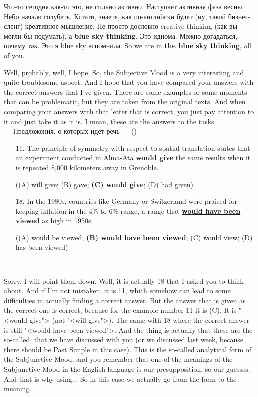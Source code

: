 \documentclass[main.tex]{subfiles}
\begin{document}

Что-то сегодня как-то это, не сильно активно.
Наступает активная фаза весны.
Небо начало голубеть.
Кстати, знаете, как по-английски будет (ну, такой бизнес-сленг) креативное мышление.
Не просто дословно creative thinking (как вы могли бы подумать), а \textbf{blue sky thinking}.
Это идиома.
Можно догадаться, почему так.
Это я blue sky вспомнила.
So we are in \textbf{the blue sky thinking}, all of you.



Well, probably, well, I hope.
So, the Subjective Mood is a very interesting and quite troublesome aspect.
And I hope that you have compared your answers with the correct answers that I've given.
There are some examples or some moments that can be problematic, but they are taken from the original texts.
And when comparing your answers with that letter that is correct, you just pay attention to it and just take it as it is.
I mean, these are the answers to the tasks.
\\

\hypertarget{ltask:2024-03-20-answers}{--- Предложения, о которых идёт речь ---} (\hyperref[task:2024-03-20]{\color{blue}{перейти к полному тексту задания}})
\\

\begin{enumerate}[nosep,leftmargin=*]
	\itemsep\eitsp
	\item[11.] The principle of symmetry with respect to spatial translation states that an experiment conducted in Alma-Ata \uline{\textbf{would give}} the same results when it is repeated 8,000 kilometers away in Grenoble.
		
		((A) will give; (B) gave; \textbf{(C) would give}; (D) had given)
	\item[18.] In the 1980s, countries like Germany or Switzerland were praised for keeping inflation in the 4\% to 6\% range, a range that \uline{\textbf{would have been viewed}} as high in 1950s.
		
		((A) would be viewed; \textbf{(B) would have been viewed}; (C) would view; (D) has been viewed)
\end{enumerate}
\ 

Sorry, I will point them down.
Well, it is actually 18 that I asked you to think about.
And if I'm not mistaken, it is 11, which somehow can lead to some difficulties in actually finding a correct answer.
But the answer that is given as the correct one is correct, because for the example number 11 it is (C).
It is "<would give"> (not "<will give">).
The same with 18 where the correct answer is still "<would have been viewed">.
And the thing is actually that these are the so-called, that we have discussed with you (or we discussed last week, because there should be Past Simple in this case).
This is the so-called analytical form of the Subjunctive Mood, and you remember that one of the meanings of the Subjunctive Mood in the English language is our presupposition, so our guesses.
And that is why using...
So in this case we actually go from the form to the meaning.
\end{document}
